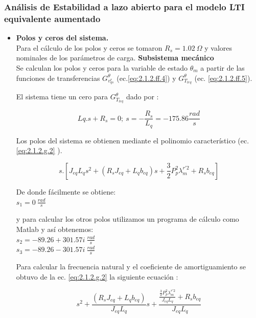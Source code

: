 \documentclass[10pt]{article}
\begin{document}
\subsubsection{Análisis de Estabilidad a lazo abierto para el modelo LTI equivalente aumentado}

\begin{itemize} 
\item \textbf{Polos y ceros del sistema.}\\
Para el cálculo de los polos y ceros se tomaron $R_{s}=1.02\ \Omega $ y valores nominales de los parámetros de carga.
\subitem \textbf{Subsistema mecánico}\\
Se calculan los polos y ceros para la variable de estado $\theta_{m}$ a partir de las funciones de transferencias $G^{\theta}_{v^{r}_{qs}}$ (ec.\ref{eq:2.1.2.ff.4}) y $G^{\theta}_{T_{leq}}$ (ec. \ref{eq:2.1.2.ff.5}).
 
El sistema tiene un cero para $G^{\theta}_{T_{leq}}$ dado por :

	\begin{equation}
	Lq . s + R_{s}=0; \ s=-\frac{R_{s}}{L_{q}} = -175.86 \frac{rad}{s}
	\label{eq:2.1.2.g.1}
	\end{equation}
	
Los polos del sistema se obtienen mediante el polinomio característico (ec. \ref{eq:2.1.2.g.2} ).

	\begin{equation}
	s.[J_{eq}L_{q}s^{2}+(R_{s}J_{eq}+L_{q}b_{eq})s + \frac{3}{2}P_{p}^{2}\lambda ^{r'2}_{m}+R_{s}b_{eq}]
	\label{eq:2.1.2.g.2}
	\end{equation}
	
De donde fácilmente se obtiene:\\
$s_{1}=0\ \frac{rad}{s}$

y para calcular los otros polos utilizamos un programa de cálculo como Matlab y así obtenemos:\\
$s_{2}=-89.26 + 301.57 i\ \frac{rad}{s}$\\
$s_{3}=-89.26 - 301.57 i\ \frac{rad}{s}$

Para calcular la frecuencia natural y el coeficiente de amortiguamiento se obtuvo de la ec. \ref{eq:2.1.2.g.2} la siguiente ecuación :

	\begin{equation}
	s^{2}+\frac{(R_{s}J_{eq}+L_{q}b_{eq})}{J_{eq}L_{q}}s +\frac{\frac{ \frac{3}{2}P_{p}^{2}\lambda ^{r'2}_{m}}{J_{eq}L_{q}}+R_{s}b_{eq}}{J_{eq}L_{q}}
	\label{eq:2.1.2.g.3}
	\end{equation}
	

\end{itemize}
\end{document}
